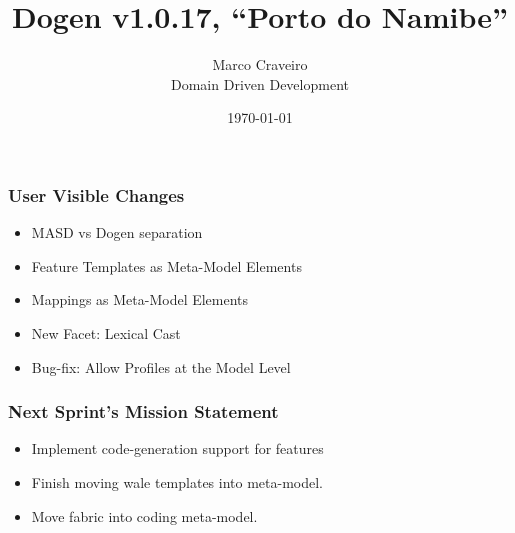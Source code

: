 \documentclass{beamer}
\title{Dogen v1.0.17, \enquote{Porto do Namibe}}
\author{Marco Craveiro \\
  Domain Driven Development
}
\date{\today}
\begin{document}
\begin{frame}
\titlepage{}
\end{frame}

\begin{frame}
\frametitle{User Visible Changes}

\begin{itemize}

\item MASD vs Dogen separation
  \pause{}
\item Feature Templates as Meta-Model Elements
  \pause{}
\item Mappings as Meta-Model Elements
  \pause{}
\item New Facet: Lexical Cast
  \pause{}
\item Bug-fix: Allow Profiles at the Model Level
  \pause{}
\end{itemize}

\end{frame}

\begin{frame}
\frametitle{Next Sprint's Mission Statement}

\begin{itemize}
\item Implement code-generation support for features
  \pause{}
\item Finish moving wale templates into meta-model.
  \pause{}
\item Move fabric into coding meta-model.
  \pause{}
\end{itemize}

\end{frame}
\end{document}
